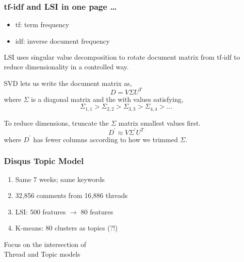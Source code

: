 \documentclass{beamer}
\begin{document}
\begin{frame}
\frametitle{tf-idf and LSI in one page \dots} 
\begin{itemize}
\item tf: term frequency
\item idf: inverse document frequency
\end{itemize}

LSI uses singular value decomposition to rotate  document matrix from tf-idf to reduce
dimensionality in a controlled way.

SVD lets us write the document matrix as,
\begin{equation*}
D = V\Sigma U^T
\label{eq:svd}
\end{equation*}
where $\Sigma$ is a diagonal matrix and the with values satisfying,
\begin{equation*}
\Sigma_{1,1} > \Sigma_{2,2} > \Sigma_{3,3} > \Sigma_{4,4} > \ldots
\label{eq:svd}
\end{equation*}

To reduce dimensions, truncate the $\Sigma$ matrix smallest values first.
\begin{equation*}
D^\prime \approx V\Sigma^\prime U^T
\label{eq:svd}
\end{equation*}
where $D^\prime$ has fewer columns according to how we trimmed $\Sigma$.
\end{frame}


\begin{frame}\frametitle{Disqus Topic Model}
\begin{center}
{\Large 
\begin{enumerate}
\item Same 7 weeks; same keywords
\item 32,856 comments from 16,886 threads
\item LSI: 500 features $\rightarrow$ 80 features
\item K-means: 80 clusters as topics (?!)
\end{enumerate}
}
\end{center}
\end{frame}

\begin{frame}
\begin{center}
{\Huge Focus on the intersection of \\[15 pt] Thread and Topic models}
\end{center}
\end{frame}
\end{document}
